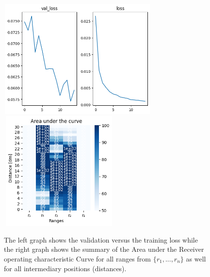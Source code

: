 \begin{figure}[h]%
\centering
\includegraphics[width=8cm,height=6cm]{3_models/models_1/graph_1.png} 
\hspace{0.2 cm}
\includegraphics[width=6cm,height=6cm]{4_plots/plots_1/AUC_1.png} 
\caption[]{The left graph shows the validation versus the training loss while the right graph shows the summary of the Area under the Receiver operating characteristic Curve for all ranges from $\{r_{1}, ... ,r_{n}\}$ as well for all intermediary positions (distances).}
\label{theta_alt}
\end{figure}

\newpage


